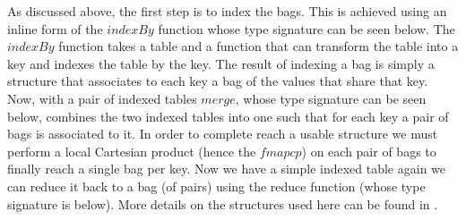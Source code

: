 As discussed above, the first step is to index the bags. This is achieved using
an inline form of the $indexBy$ function whose type
signature can be seen below. The $indexBy$ function
takes a table and a function that can transform the table into a key and indexes
the table by the key. The result of indexing a bag is simply a structure that
associates to each key a bag of the values that share that key. Now, with a pair of indexed tables
$merge$, whose type signature can be seen below,
combines the two indexed tables into one such that for each key a pair of bags is
associated to it. In order to complete reach a usable structure we must perform
a local Cartesian product (hence the $fmap cp$) on
each pair of bags to finally reach a single bag per key. Now we have a simple
indexed table again we can reduce it back to a bag (of pairs) using the reduce function
(whose type signature is below). More details on the structures used here can be
found in .


